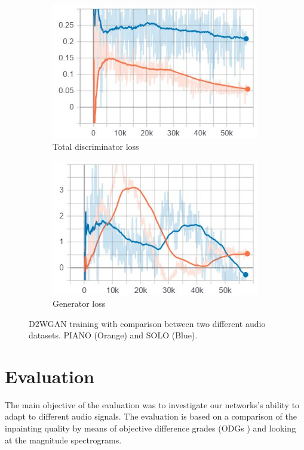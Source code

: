 \documentclass{article} %
\begin{document}
\begin{figure}[h!]
  \centering
  \begin{subfigure}[b]{0.4\linewidth}
    \includegraphics[width=\linewidth]{images/extend/extend_neg_loss.jpg}
    \caption{Total discriminator loss}
  \end{subfigure}
  \begin{subfigure}[b]{0.4\linewidth}
    \includegraphics[width=\linewidth]{images/extend/extend_gen_loss.jpg}
    \caption{Generator loss}
  \end{subfigure}
  \caption{D2WGAN training with comparison between two different audio datasets. PIANO (Orange) and SOLO (Blue).}
  \label{fig:loss}
\end{figure}

\section{Evaluation}
The main objective of the evaluation was to investigate our networks's ability to adapt to different audio signals. The evaluation is based on a comparison of the inpainting quality by means of objective difference grades (ODGs \cite{recommendatioin2001}) and looking at the magnitude spectrograms.
\end{document}
